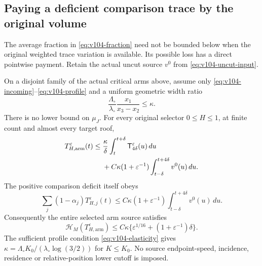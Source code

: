 \subsection{Paying a deficient comparison trace by the original volume}
The average fraction in \eqref{eq:v104-fraction} need not be bounded
below when the original weighted trace variation is available. Its
possible loss has a direct pointwise payment. Retain the actual
uncut source $v^0$ from \eqref{eq:v104-uncut-input}.

\begin{theorem}
\label{thm:v104-paid-arms}
On a disjoint family of the actual critical arms above, assume only
\eqref{eq:v104-incoming}--\eqref{eq:v104-profile} and a uniform
geometric width ratio
\[
 \frac{\Lambda_\circ}{\lambda_\circ}
              \frac{x_1}{x_3-x_2}\le\kappa.
\]
There is no lower bound on $\mu_J$. For every original selector
$0\le H\le1$, at finite count and almost every target roof,
\begin{align}
 T_{H,\mathrm{arm}}^\varepsilon(t)
 \le{}&\frac{\kappa}{\delta}\int_t^{t+\delta}
                       \mathsf T_{4\delta}^\varepsilon(u)\,du\notag\\
 &+C\kappa(1+\varepsilon^{-1})
                         \int_{t-\delta}^{t+4\delta}v^0(u)\,du.
                                           \label{eq:v104-paid-arms-finite}
\end{align}
The positive comparison deficit itself obeys
\begin{equation}\label{eq:v104-paid-deficit}
 \sum_j(1-\alpha_j)T_{H,j}^\varepsilon(t)
 \le C\kappa(1+\varepsilon^{-1})
                         \int_{t-\delta}^{t+4\delta}v^0(u)\,du.
\end{equation}
Consequently the entire selected arm source satisfies
\begin{equation}\label{eq:v104-paid-arms-height}
 \mathcal H_M(T_{H,\mathrm{arm}}^\varepsilon)
 \le C\kappa\{\varepsilon^{1/16}+(1+\varepsilon^{-1})\delta\}.
\end{equation}
The sufficient profile condition \eqref{eq:v104-elasticity} gives
$\kappa=\Lambda_\circ K_0/(\lambda_\circ\log(3/2))$ for $K\le K_0$.
No source endpoint-speed, incidence, residence or relative-position
lower cutoff is imposed.
\end{theorem}
